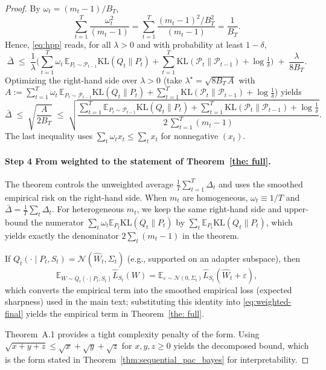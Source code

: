 \documentclass{article}
\begin{document}
\begin{proof}
By $\omega_t=(m_t-1)/B_T$,
\[
\sum_{t=1}^T \frac{\omega_t^2}{(m_t-1)}
=\sum_{t=1}^T \frac{(m_t-1)^2/B_T^2}{(m_t-1)}
=\frac{1}{B_T}.
\]
Hence, \eqref{eq:hpp} reads, for all $\lambda>0$ and with probability at least $1-\delta$,
\begin{equation}
\label{eq:gap-preopt}
\bar\Delta
\;\le\;
\frac{1}{\lambda}\Big(
\sum_{t=1}^T \omega_t\,\mathbb E_{P_t\sim\mathcal P_{t-1}}\mathrm{KL}(Q_t\|P_t)
+ \sum_{t=1}^T \mathrm{KL}(\mathcal P_t\|\mathcal P_{t-1})
+ \log\tfrac1\delta\Big)
\;+\;
\frac{\lambda}{8B_T}.
\end{equation}
Optimizing the right-hand side over $\lambda>0$ (take $\lambda^\star=\sqrt{8B_T\,A}$ with
$A:=\sum_{t=1}^T \omega_t\,\mathbb E_{P_t\sim\mathcal P_{t-1}}\mathrm{KL}(Q_t\|P_t)
+ \sum_{t=1}^T \mathrm{KL}(\mathcal P_t\|\mathcal P_{t-1}) + \log\tfrac1\delta$) yields
\begin{equation}
\label{eq:weighted-final}
\bar\Delta
\;\le\;
\sqrt{\frac{A}{2B_T}}
\;\le\;
\sqrt{\frac{
\sum_{t=1}^T \mathbb E_{P_t\sim\mathcal P_{t-1}}\mathrm{KL}(Q_t\|P_t)
+ \sum_{t=1}^T \mathrm{KL}(\mathcal P_t\|\mathcal P_{t-1})
+ \log\tfrac1\delta}{2\,\sum_{t=1}^T (m_t-1)}}.
\end{equation}
The last inequality uses $\sum_t \omega_t x_t \le \sum_t x_t$ for nonnegative $(x_t)$.

\paragraph{Step 4 From weighted to the statement of Theorem~\ref{the: full}.}
The theorem controls the unweighted average $\frac1T\sum_{t=1}^T \Delta_t$ and uses the smoothed empirical risk on the right-hand side.
When $m_t$ are homogeneous, $\omega_t\equiv 1/T$ and $\bar\Delta=\frac1T\sum_t\Delta_t$.
For heterogeneous $m_t$, we keep the same right-hand side and upper-bound the numerator $\sum_t \omega_t \mathbb E_{P_t}\mathrm{KL}(Q_t\|P_t)$ by $\sum_t \mathbb E_{P_t}\mathrm{KL}(Q_t\|P_t)$, which yields exactly the denominator $2\sum_t(m_t-1)$ in the theorem.


If $Q_t(\cdot\mid P_t,S_t)=\mathcal N(\hat W_t,\Sigma_t)$ (e.g., supported on an adapter subspace), then
\[
\mathbb E_{W\sim Q_t(\cdot\mid P_t,S_t)}\hat L_{S_t}(W)
=\mathbb E_{\varepsilon\sim\mathcal N(0,\Sigma_t)}\hat L_{S_t}(\hat W_t+\varepsilon),
\]
which converts the empirical term into the smoothed empirical loss (expected sharpness) used in the main text; substituting this identity into \eqref{eq:weighted-final} yields the empirical term in Theorem~\ref{the: full}.

Theorem~A.1 provides a tight complexity penalty of the form.
Using $\sqrt{x+y+z}\le \sqrt{x}+\sqrt{y}+\sqrt{z}$ for $x,y,z\ge 0$ yields the decomposed bound, which is the form stated in Theorem~\ref{thm:sequential_pac_bayes} for interpretability.

\end{proof}
\end{document}

